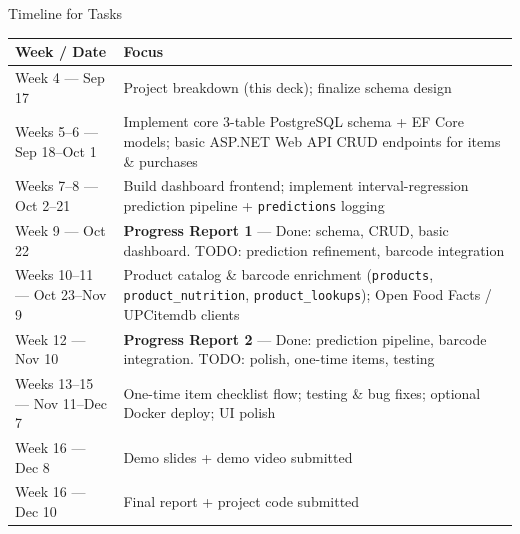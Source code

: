 \documentclass[aspectratio=169]{beamer}
\begin{document}
\begin{frame}{Timeline for Tasks}
  \scriptsize
  \begin{tabularx}{\linewidth}{>{\raggedright\arraybackslash}p{3.4cm} X}
    \toprule
    \textbf{Week / Date} & \textbf{Focus} \\
    \midrule
    Week 4 --- Sep 17 & Project breakdown (this deck); finalize schema design \\
    Weeks 5--6 --- Sep 18--Oct 1 & Implement core 3-table PostgreSQL schema + EF Core models; basic ASP.NET Web API CRUD endpoints for items \& purchases \\
    Weeks 7--8 --- Oct 2--21 & Build dashboard frontend; implement interval-regression prediction pipeline + \texttt{predictions} logging \\
    Week 9 --- Oct 22 & \textbf{Progress Report 1} --- Done: schema, CRUD, basic dashboard. TODO: prediction refinement, barcode integration \\
    Weeks 10--11 --- Oct 23--Nov 9 & Product catalog \& barcode enrichment (\texttt{products}, \texttt{product\_nutrition}, \texttt{product\_lookups}); Open Food Facts / UPCitemdb clients \\
    Week 12 --- Nov 10 & \textbf{Progress Report 2} --- Done: prediction pipeline, barcode integration. TODO: polish, one-time items, testing \\
    Weeks 13--15 --- Nov 11--Dec 7 & One-time item checklist flow; testing \& bug fixes; optional Docker deploy; UI polish \\
    Week 16 --- Dec 8 & Demo slides + demo video submitted \\
    Week 16 --- Dec 10 & Final report + project code submitted \\
    \bottomrule
  \end{tabularx}
\end{frame}
\end{document}
